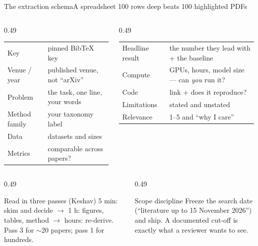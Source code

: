 \documentclass[aspectratio=169,11pt]{beamer}
\begin{document}
\begin{frame}{The extraction schema}{A spreadsheet 100 rows deep beats 100 highlighted PDFs}
\footnotesize
\begin{columns}[T]
\begin{column}{0.49\textwidth}
\begin{tabularx}{\textwidth}{>{\raggedright\arraybackslash}p{2.0cm} X}
\toprule
\rowcolor{rowtint} Key & pinned BibTeX key \\
Venue / year & published venue, not ``arXiv'' \\
\rowcolor{rowtint} Problem & the task, one line, your words \\
Method family & your taxonomy label \\
\rowcolor{rowtint} Data & datasets and sizes \\
Metrics & comparable across papers? \\
\bottomrule
\end{tabularx}
\end{column}
\begin{column}{0.49\textwidth}
\begin{tabularx}{\textwidth}{>{\raggedright\arraybackslash}p{2.1cm} X}
\toprule
\rowcolor{rowtint} Headline result & the number they lead with + the baseline \\
Compute & GPUs, hours, model size --- can \emph{you} run it? \\
\rowcolor{rowtint} Code & link + does it reproduce? \\
Limitations & stated and unstated \\
\rowcolor{rowtint} Relevance & 1--5 and ``why I care'' \\
\bottomrule
\end{tabularx}
\end{column}
\end{columns}
\vspace{3mm}
\begin{columns}[T]
\begin{column}{0.49\textwidth}
\begin{block}{Read in three passes (Keshav)}
\footnotesize
5 min: skim and decide $\rightarrow$ 1 h: figures, tables, method $\rightarrow$
hours: re-derive. Pass 3 for $\sim$20 papers; pass 1 for hundreds.
\end{block}
\end{column}
\begin{column}{0.49\textwidth}
\begin{alertblock}{Scope discipline}
\footnotesize
Freeze the search date (``literature up to 15 November 2026'') and ship. A
documented cut-off is exactly what a reviewer wants to see.
\end{alertblock}
\end{column}
\end{columns}
\end{frame}
\end{document}
